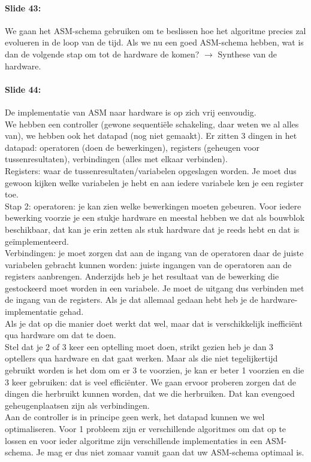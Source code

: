 \documentclass[10pt,a4paper]{book}
\begin{document}
\paragraph{Slide 43:} We gaan het ASM-schema gebruiken om te beslissen hoe het algoritme precies zal evolueren in de loop van de tijd. Als we nu een goed ASM-schema hebben, wat is dan de volgende stap om tot de hardware de komen? $\rightarrow$ Synthese van de hardware. 

\paragraph{Slide 44:} De implementatie van ASM naar hardware is op zich vrij eenvoudig.\\
We hebben een controller (gewone sequenti\"ele schakeling, daar weten we al alles van), we hebben ook het datapad (nog niet gemaakt). Er zitten 3 dingen in het datapad: operatoren (doen de bewerkingen), registers (geheugen voor tussenresultaten), verbindingen (alles met elkaar verbinden).\\
Registers: waar de tussenresultaten/variabelen opgeslagen worden. Je moet dus gewoon kijken welke variabelen je hebt en aan iedere variabele ken je een register toe.\\
Stap 2: operatoren: je kan zien welke bewerkingen moeten gebeuren. Voor iedere bewerking voorzie je een stukje hardware en meestal hebben we dat als bouwblok beschikbaar, dat kan je erin zetten als stuk hardware dat je reeds hebt en dat is ge\"implementeerd.\\
Verbindingen: je moet zorgen dat aan de ingang van de operatoren daar de juiste variabelen gebracht kunnen worden: juiste ingangen van de operatoren aan de registers aanbrengen. Anderzijds heb je het resultaat van de bewerking die gestockeerd moet worden in een variabele. Je moet de uitgang dus verbinden met de ingang van de registers. Als je dat allemaal gedaan hebt heb je de hardware-implementatie gehad.\\
Als je dat op die manier doet werkt dat wel, maar dat is verschikkelijk ineffici\"ent qua hardware om dat te doen.\\
Stel dat je 2 of 3 keer een optelling moet doen, strikt gezien heb je dan 3 optellers qua hardware en dat gaat werken. Maar als die niet tegelijkertijd gebruikt worden is het dom om er 3 te voorzien, je kan er beter 1 voorzien en die 3 keer gebruiken: dat is veel effici\"enter. We gaan ervoor proberen zorgen dat de dingen die herbruikt kunnen worden, dat we die herbruiken. Dat kan evengoed geheugenplaatsen zijn als verbindingen.\\
Aan de controller is in principe geen werk, het datapad kunnen we wel optimaliseren. Voor 1 probleem zijn er verschillende algoritmes om dat op te lossen en voor ieder algoritme zijn verschillende implementaties in een ASM-schema. Je mag er dus niet zomaar vanuit gaan dat uw ASM-schema optimaal is.
\end{document}
